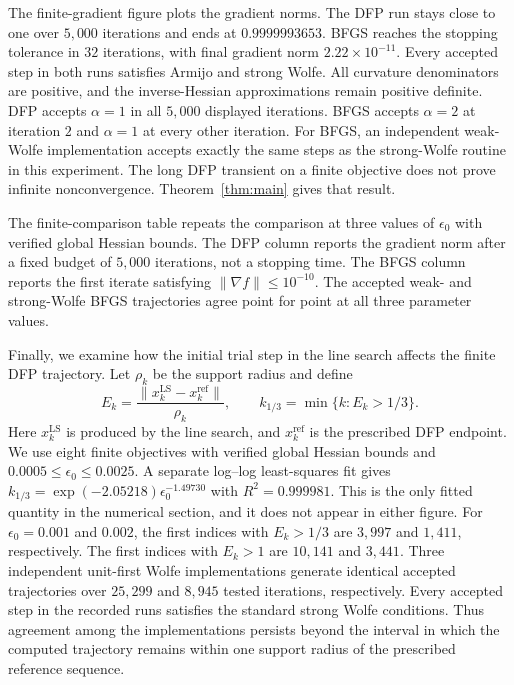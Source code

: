 \documentclass[11pt]{article}
\begin{document}
The finite-gradient figure plots the gradient norms.  The DFP
run stays close to one over $5{,}000$ iterations and ends at $0.9999993653$.
BFGS reaches the stopping tolerance in $32$ iterations, with final gradient
norm $2.22\times10^{-11}$.  Every accepted step in both runs satisfies Armijo
and strong Wolfe.  All curvature denominators are positive, and the
inverse-Hessian approximations remain positive definite.  DFP accepts
$\alpha=1$ in all $5{,}000$ displayed iterations.  BFGS accepts $\alpha=2$ at
iteration $2$ and $\alpha=1$ at every other iteration.
For BFGS, an independent weak-Wolfe implementation accepts exactly the same
steps as the strong-Wolfe routine in this experiment.  The long DFP transient
on a finite objective does not prove infinite nonconvergence.
Theorem~\ref{thm:main} gives that result.




The finite-comparison table repeats the comparison at three values of
$\epsilon_0$ with verified global Hessian bounds.
The DFP column reports the gradient norm after a fixed budget of $5{,}000$
iterations, not a stopping time.  The BFGS column reports the first iterate
satisfying $\|\nabla f\|\le10^{-10}$.  The accepted weak- and strong-Wolfe
BFGS trajectories agree point for point at all three parameter values.




Finally, we examine how the initial trial step in the line search affects the
finite DFP trajectory.  Let $\rho_k$ be the support radius and define
\[
E_k=\frac{\|x_k^{\mathrm{LS}}-x_k^{\mathrm{ref}}\|}{\rho_k},
\qquad
k_{1/3}=\min\{k:E_k>1/3\}.
\]
Here $x_k^{\mathrm{LS}}$ is produced by the line search, and
$x_k^{\mathrm{ref}}$ is the prescribed DFP endpoint.  We use eight finite
objectives with verified global Hessian bounds and
$0.0005\le\epsilon_0\le0.0025$.  A separate log--log least-squares fit gives
$k_{1/3}=\exp(-2.05218)\epsilon_0^{-1.49730}$ with $R^2=0.999981$.  This is the
only fitted quantity in the numerical section, and it does not appear in
either figure.  For $\epsilon_0=0.001$ and $0.002$, the first indices with
$E_k>1/3$ are $3{,}997$ and $1{,}411$, respectively.  The first indices with
$E_k>1$ are $10{,}141$ and $3{,}441$.  Three independent unit-first Wolfe
implementations generate identical accepted trajectories over $25{,}299$ and
$8{,}945$ tested iterations, respectively.  Every accepted step in the
recorded runs satisfies the standard strong Wolfe conditions.  Thus agreement
among the implementations persists beyond the interval in which the computed
trajectory remains within one support radius of the prescribed reference
sequence.
\end{document}
